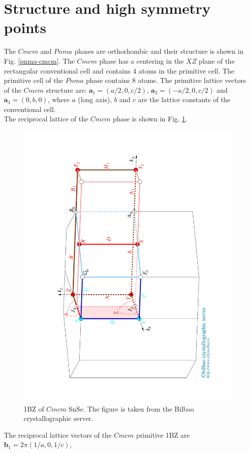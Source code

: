 \section{Structure and high symmetry points}

The $Cmcm$ and $Pnma$ phases are orthorhombic and their structure  is shown in Fig. \ref{pnma-cmcm}. The $Cmcm$ phase 
has a centering in the $XZ$ plane of the rectangular conventional cell and contains 4 atoms in the primitive cell. 
The primitive cell of the $Pnma$ phase contains $8$ atoms. The primitive lattice vectors 
of the $Cmcm$ structure are: $\mathbf{a}_{1}=(a/2,0,c/2)$, $\mathbf{a}_{2}=(-a/2,0,c/2)$ and
$\mathbf{a}_{3}=(0,b,0)$, where $a$ (long axis), $b$ and $c$ are the lattice constants of the conventional cell. \\

The reciprocal lattice of the $Cmcm$ phase is shown in Fig. \ref{1bzsnse}.
\begin{figure}[h]
\begin{center}
\includegraphics[width=0.8\linewidth, angle=-90]{Figures/brillouinsnse.pdf}
\caption{1BZ of $Cmcm$ SnSe. The figure is taken from the Bilbao crystallographic server.}
\label{1bzsnse}
\end{center}
\end{figure}
The reciprocal lattice vectors of the $Cmcm$ primitive 1BZ are $\mathbf{b}_{1}=2\pi(1/a,0,1/c)$, 

